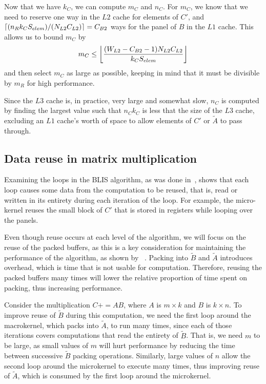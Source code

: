 \documentclass[12pt]{article}
\DeclarePairedDelimiter\ceil{\lceil}{\rceil}
\DeclarePairedDelimiter\floor{\lfloor}{\rfloor}
\newcommand*{\pluseq}{\mathrel{{+}{=}}}
\newcommand*{\mycite}[1]{~\cite{#1}}
\begin{document}
Now that we have $k_C$, we can compute $m_C$ and $n_C$.
For $m_C$, we know that we need to reserve one way in the $L2$ cache for elements of $C'$, and $\ceil*{(n_Rk_CS_{elem})/(N_{L2}C_{L2})} = C_{B2}$ ways for the panel of $B$ in the $L1$ cache.
This allows us to bound $m_C$ by
\begin{equation*}
  m_C \leq \floor*{\frac{(W_{L2} - C_{B2} - 1)N_{L2}C_{L2}}{k_CS_{elem}}}
\end{equation*}
and then select $m_C$ as large as possible, keeping in mind that it must be divisible by $m_R$ for high performance.

Since the $L3$ cache is, in practice, very large and somewhat slow, $n_C$ is computed by finding the largest value such that $n_Ck_C$ is less that the size of the $L3$ cache, excluding an $L1$ cache's worth of space to allow elements of $C'$ or $\widetilde{A}$ to pass through.

\subsection{Data reuse in  matrix multiplication}
Examining the loops in the BLIS algorithm, as was done in\mycite{Low2016}, shows that each loop causes some data from the computation to be reused, that is, read or written in its entirety during each iteration of the loop.
For example, the micro-kernel reuses the small block of $C'$ that is stored in registers while looping over the panels.

Even though reuse occurs at each level of the algorithm, we will focus on the reuse of the packed buffers, as this is a key consideration for maintaining the performance of the algorithm, as shown by \mycite{Henry92}.
Packing into $\widetilde{B}$ and $\widetilde{A}$ introduces overhead, which is time that is not usable for computation.
Therefore, reusing the packed buffers many times will lower the relative proportion of time spent on packing, thus increasing performance.

Consider the multiplication $C \pluseq AB$, where $A$ is $m \times k$ and $B$ is $k \times n$.
To improve reuse of $\widetilde{B}$ during this computation, we need the first loop around the macrokernel, which packs into $\widetilde{A}$, to run many times, since each of those iterations covers computations that read the entirety of $\widetilde{B}$.
That is, we need $m$ to be large, as small values of $m$ will hurt performance by reducing the time between successive $\widetilde{B}$ packing operations.
Similarly, large values of $n$ allow the second loop around the microkernel to execute many times, thus improving reuse of $\widetilde{A}$, which is consumed by the first loop around the microkernel.
\end{document}
